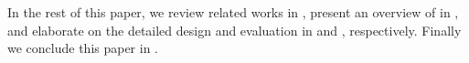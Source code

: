 In the rest of this paper, we review related works in , present an overview of \sysname in , and elaborate on the detailed design and evaluation in  and , respectively.
Finally we conclude this paper in .
